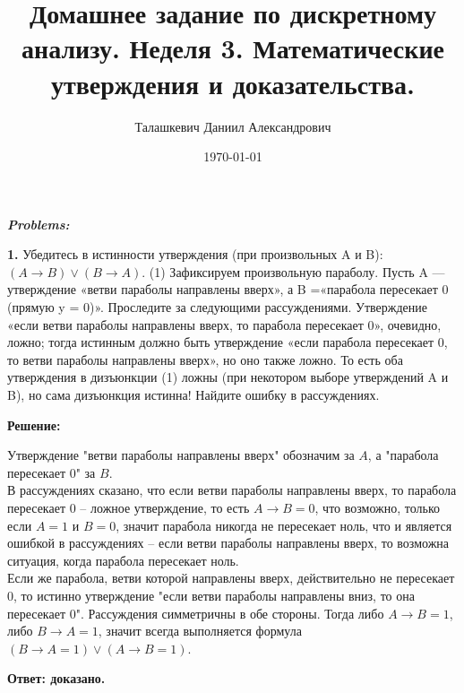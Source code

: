 \documentclass[a4paper,12pt]{article} %
\author{Талашкевич Даниил Александрович}
\title{Домашнее задание по дискретному анализу. Неделя 3. Математические утверждения и доказательства.}
\date{\today}
\begin{document}
\maketitle
\thispagestyle{empty}

\newpage
\setcounter{page}{1}
\begin{center}
\itshape
\bfseries
{ \Large Problems:}
\end{center}

{\bf 1.} Убедитесь в истинности утверждения (при произвольных A и B):
$(A \rightarrow B) \vee (B \rightarrow A).$ (1)
Зафиксируем произвольную параболу. Пусть A — утверждение «ветви
параболы направлены вверх», а B =«парабола пересекает 0 (прямую
y = 0)». Проследите за следующими рассуждениями. Утверждение
«если ветви параболы направлены вверх, то парабола пересекает 0»,
очевидно, ложно; тогда истинным должно быть утверждение «если
парабола пересекает 0, то ветви параболы направлены вверх», но оно
также ложно. То есть оба утверждения в дизъюнкции (1) ложны (при
некотором выборе утверждений A и B), но сама дизъюнкция истинна!
Найдите ошибку в рассуждениях.



\begin{center}
\bfseries
{\Large Решение: }
\end{center}

Утверждение "ветви параболы направлены вверх"\hspace{1pt} обозначим за $A$, а "парабола пересекает 0"\hspace{1pt} за $B$. \\
В рассуждениях сказано, что если ветви параболы направлены вверх, то парабола пересекает 0 -- ложное утверждение, то есть $A\rightarrow B = 0$, что возможно, только если $A = 1$ и $B = 0$, значит парабола никогда не пересекает ноль, что и является ошибкой в рассуждениях -- если ветви параболы направлены вверх, то возможна ситуация, когда парабола пересекает ноль.\\
Если же парабола, ветви которой направлены вверх, действительно не пересекает 0, то истинно утверждение "если ветви параболы направлены вниз, то она пересекает 0". Рассуждения симметричны в обе стороны. Тогда либо $A\rightarrow B = 1$, либо $B\rightarrow A = 1$, значит всегда выполняется формула
$(B\rightarrow A = 1) \vee (A\rightarrow B = 1)$.

\begin{flushright}
\begin{large}
\textbf {Ответ: доказано.}
\end{large}
\end{flushright}
\end{document}
